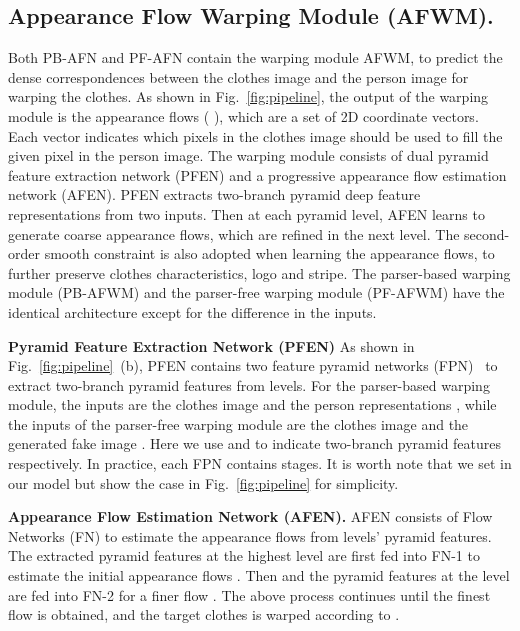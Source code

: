 \documentclass[final]{cvpr}
\begin{document}
	
	\subsection{Appearance Flow Warping Module (AFWM).} \label{sec:flow}
Both PB-AFN and PF-AFN contain the warping module AFWM, to predict the dense correspondences between the clothes image and the person image for warping the clothes.
As shown in Fig.~\ref{fig:pipeline}, the output of the warping module is the appearance flows ( \eg  ), which are a set of 2D coordinate vectors.
Each vector indicates which pixels in the clothes image should be used to fill the given pixel in the person image.
The warping module consists of dual pyramid feature extraction network (PFEN) and a progressive appearance flow estimation network (AFEN).
PFEN extracts two-branch pyramid deep feature representations from two inputs.
Then at each pyramid level, AFEN learns to generate coarse appearance flows, which are refined in the next level. 
The second-order smooth constraint is also adopted when learning the appearance flows, to further preserve clothes characteristics, \eg logo and stripe.
The parser-based warping module (PB-AFWM) and the parser-free warping module (PF-AFWM) have the identical architecture except for the difference in the inputs.
	
	\textbf{Pyramid Feature Extraction Network (PFEN)}
As shown in Fig.~\ref{fig:pipeline}~(b), PFEN contains two feature pyramid networks (FPN)~\cite{fpn} to extract two-branch pyramid features from  levels.
For the parser-based warping module, the inputs are the clothes image  and the person representations , while the inputs of the parser-free warping module are the clothes image  and the generated fake image .
Here we use  and  to indicate two-branch pyramid features respectively.
In practice, each FPN contains  stages. It is worth note that we set  in our model but show the case  in Fig.~\ref{fig:pipeline} for simplicity.
	
	
	\textbf{Appearance Flow Estimation Network (AFEN).}
AFEN consists of  Flow Networks (FN) to estimate the appearance flows from  levels' pyramid features.
The extracted pyramid features  at the highest level  are first fed into FN-1 to estimate the initial appearance flows .
Then  and the pyramid features at the  level are fed into FN-2 for a finer flow .
The above process continues until the finest flow  is obtained, and the target clothes is warped according to .
	
\end{document}
